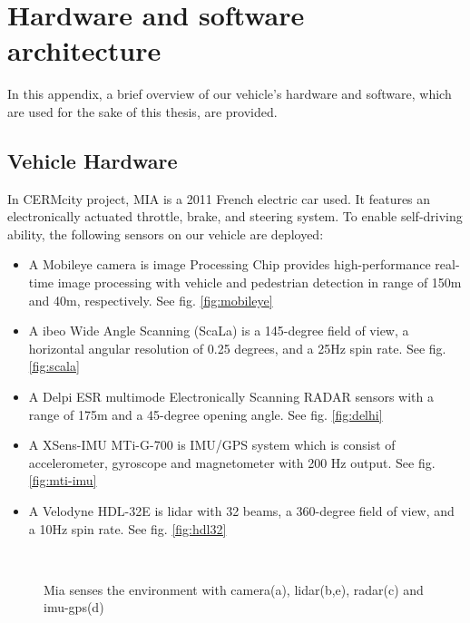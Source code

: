 \chapter{Hardware and software architecture}
In this appendix, a brief overview of our vehicle's hardware and software, which are used for the sake of this thesis, are provided.
\section{Vehicle Hardware}
In CERMcity project, MIA is a 2011 French electric car used. It features an electronically actuated throttle, brake, and steering system. To enable self-driving ability, the following sensors on our vehicle are deployed:
\begin{itemize}
    \item A Mobileye camera is image Processing Chip provides high-performance real-time image processing with vehicle and pedestrian detection in range of 150m and 40m, respectively. See fig. \ref{fig:mobileye}
    \item A ibeo Wide Angle Scanning (ScaLa) is a 145-degree field of view, a horizontal angular resolution of 0.25 degrees, and a 25Hz spin rate. See fig. \ref{fig:scala}
    \item A Delpi ESR multimode Electronically Scanning RADAR sensors with a range of 175m and a 45-degree opening angle. See fig. \ref{fig:delhi}
    \item A XSens-IMU MTi-G-700 is IMU/GPS system which is consist of accelerometer, gyroscope and magnetometer with 200 Hz output. See fig. \ref{fig:mti-imu}
    \item A Velodyne HDL-32E is \acrfull{lidar} with 32 beams, a 360-degree field of view, and a 10Hz spin rate. See fig. \ref{fig:hdl32}
\end{itemize}
\vspace{-0.7cm}
\begin{figure}[H]
    \centering
    \hfill
    \hfill
    \\
    \hspace{2cm}
    \caption{Mia senses the environment with camera(a), lidar(b,e), radar(c) and imu-gps(d)  }
\end{figure}
